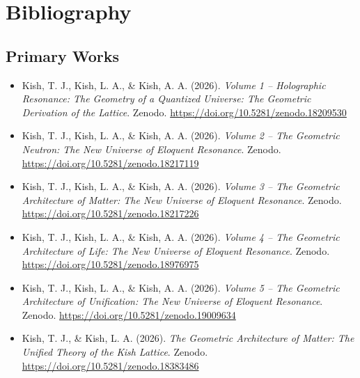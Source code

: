 \documentclass[11pt, letterpaper, openany]{book}
\begin{document}
\chapter*{Bibliography}
\section*{Primary Works}
\begin{itemize}
    \item Kish, T. J., Kish, L. A., \& Kish, A. A. (2026). \textit{Volume 1 -- Holographic Resonance: The Geometry of a Quantized Universe: The Geometric Derivation of the Lattice}. Zenodo. \url{https://doi.org/10.5281/zenodo.18209530}

    \item Kish, T. J., Kish, L. A., \& Kish, A. A. (2026). \textit{Volume 2 -- The Geometric Neutron: The New Universe of Eloquent Resonance}. Zenodo. \url{https://doi.org/10.5281/zenodo.18217119}
	
	\item Kish, T. J., Kish, L. A., \& Kish, A. A. (2026). \textit{Volume 3 -- The Geometric Architecture of Matter: The New Universe of Eloquent Resonance}. Zenodo. \url{https://doi.org/10.5281/zenodo.18217226}
	
	\item Kish, T. J., Kish, L. A., \& Kish, A. A. (2026). \textit{Volume 4 -- The Geometric Architecture of Life: The New Universe of Eloquent Resonance}. Zenodo. \url{https://doi.org/10.5281/zenodo.18976975}
	
	\item Kish, T. J., Kish, L. A., \& Kish, A. A. (2026). \textit{Volume 5 -- The Geometric Architecture of Unification: The New Universe of Eloquent Resonance}. Zenodo. \url{https://doi.org/10.5281/zenodo.19009634}

    \item Kish, T. J., \& Kish, L. A. (2026). \textit{The Geometric Architecture of Matter: The Unified Theory of the Kish Lattice}. Zenodo. \url{https://doi.org/10.5281/zenodo.18383486}
\end{itemize}
\end{document}
